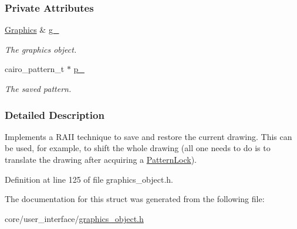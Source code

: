 \subsubsection*{Private Attributes}
\begin{DoxyCompactItemize}
\item 
\hyperlink{structGraphics}{Graphics} \& \hyperlink{structPatternLock_a3f833f348dce4cb1df861f05a17d670e}{g\+\_\+}\hypertarget{structPatternLock_a3f833f348dce4cb1df861f05a17d670e}{}\label{structPatternLock_a3f833f348dce4cb1df861f05a17d670e}

\begin{DoxyCompactList}\small\item\em The graphics object. \end{DoxyCompactList}\item 
cairo\+\_\+pattern\+\_\+t $\ast$ \hyperlink{structPatternLock_a9ea26c3aeaebbba9ca9bc7a1f4e7e68c}{p\+\_\+}\hypertarget{structPatternLock_a9ea26c3aeaebbba9ca9bc7a1f4e7e68c}{}\label{structPatternLock_a9ea26c3aeaebbba9ca9bc7a1f4e7e68c}

\begin{DoxyCompactList}\small\item\em The saved pattern. \end{DoxyCompactList}\end{DoxyCompactItemize}


\subsubsection{Detailed Description}
Implements a R\+A\+II technique to save and restore the current drawing. This can be used, for example, to shift the whole drawing (all one needs to do is to translate the drawing after acquiring a \hyperlink{structPatternLock}{Pattern\+Lock}). 

Definition at line 125 of file graphics\+\_\+object.\+h.



The documentation for this struct was generated from the following file\+:\begin{DoxyCompactItemize}
\item 
core/user\+\_\+interface/\hyperlink{graphics__object_8h}{graphics\+\_\+object.\+h}\end{DoxyCompactItemize}
